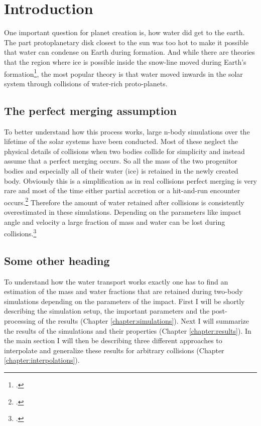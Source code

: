 \chapter{Introduction}\label{introduction}

One important question for planet creation is, how water did get to the earth. The part protoplanetary disk closest to the sun was too hot to make it possible that water can condense on Earth during formation. And while there are theories that the region where ice is possible inside the snow-line moved during Earth's formation\footcite{snowline}, the most popular theory is that water moved inwards in the solar system through collisions of water-rich proto-planets.%


\section{The perfect merging assumption}

To better understand how this process works, large n-body simulations over the lifetime of the solar systems have been conducted. Most of these neglect the physical details of collisions when two bodies collide for simplicity and instead assume that a perfect merging occurs. So all the mass of the two progenitor bodies and especially all of their water (ice) is retained in the newly created body. Obviously this is a simplification as in real collisions perfect merging is very rare and most of the time either partial accretion or a hit-and-run encounter occurs.\footcite{CollisionTypes} Therefore the amount of water retained after collisions is consistently overestimated in these simulations. Depending on the parameters like impact angle and velocity a large fraction of mass and water can be lost during collisions.\footcite{MaindlSummary}

\section{Some other heading}

To understand how the water transport works exactly one has to find an estimation of the mass and water fractions that are retained during two-body simulations depending on the parameters of the impact.
First I will be shortly describing the simulation setup, the important parameters and the post-processing of the results (Chapter \ref{chapter:simulations}). Next I will summarize the results of the simulations and their properties (Chapter \ref{chapter:results}). In the main section I will then be describing three different approaches to interpolate and generalize these results for arbitrary collisions (Chapter \ref{chapter:interpolations}). 